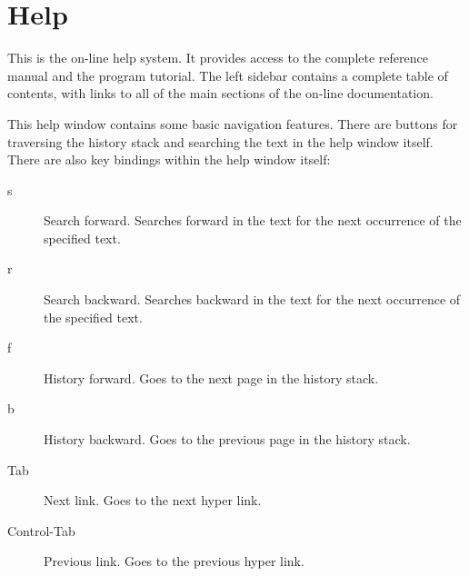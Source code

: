 \chapter{Help}
\label{Help}

This is the on-line help system. It provides access to the complete reference
manual and the program tutorial.  The left sidebar contains a complete
table of contents, with links to all of the main sections of the on-line
documentation. 

This help window contains some basic navigation features.  There are
buttons for traversing the history stack and searching the text in the
help window itself.  There are also key bindings
within the help window itself:

\begin{description}
\item[s] Search forward.  Searches forward in the text for the next
occurrence of the specified text.
\item[r] Search backward.  Searches backward in the text for the next
occurrence of the specified text.
\item[f] History forward.  Goes to the next page in the history stack.
\item[b] History backward. Goes to the previous page in the history
stack.
\item[Tab] Next link. Goes to the next hyper link.
\item[Control-Tab] Previous link. Goes to the previous hyper link.
\end{description}




